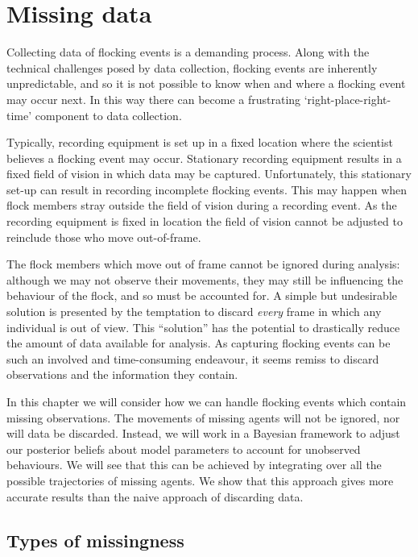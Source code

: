 \graphicspath{{fig/missing/}}

\chapter{Missing data}
\label{cha:missing}

Collecting data of flocking events is a demanding process. Along with the
technical challenges posed by data collection, flocking events are inherently
unpredictable, and so it is not possible to know when and where a flocking
event may occur next. In this way there can become a frustrating
`right-place-right-time' component to data collection.

Typically, recording equipment is set up in a fixed location where the
scientist believes a flocking event may occur. Stationary recording equipment
results in a fixed field of vision in which data may be captured.
Unfortunately, this stationary set-up can result in recording incomplete
flocking events. This may happen when flock members stray outside the field of
vision during a recording event. As the recording equipment is fixed in
location the field of vision cannot be adjusted to reinclude those who move
out-of-frame.

The flock members which move out of frame cannot be ignored during analysis:
although we may not observe their movements, they may still be influencing the
behaviour of the flock, and so must be accounted for. A simple but undesirable
solution is presented by the temptation to discard \emph{every} frame in which
any individual is out of view. This ``solution'' has the potential to
drastically reduce the amount of data available for analysis. As capturing
flocking events can be such an involved and time-consuming endeavour, it seems
remiss to discard observations and the information they contain.

In this chapter we will consider how we can handle flocking events which
contain missing observations. The movements of missing agents will not be
ignored, nor will data be discarded. Instead, we will work in a Bayesian framework
to adjust our posterior beliefs about model parameters to account for
unobserved behaviours. We will see that this can be achieved by integrating
over all the possible trajectories of missing agents. We show that
this approach gives more accurate results than the naive approach of discarding
data.

\section{Types of missingness}

